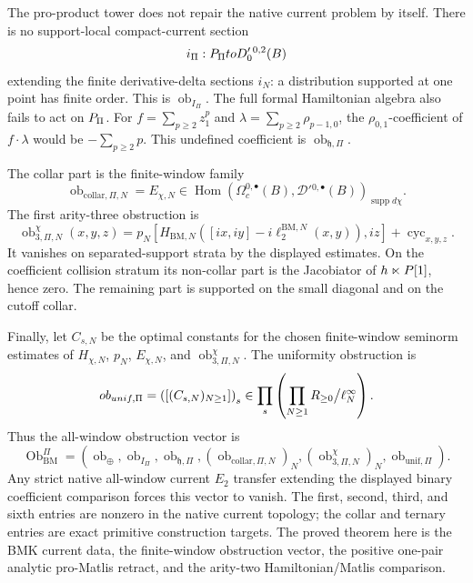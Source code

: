 \begin{thm}
  The pro-product tower does not repair the native current problem by
  itself.  There is no support-local compact-current section
  \[
    i_\Pi:P_{\Pi}toD'_0{}^{0,2}(B)
  \]
  extending the finite derivative-delta sections \(i_N\): a distribution
  supported at one point has finite order.  This is
  \(\operatorname{ob}_{I_\Pi}\).  The full formal Hamiltonian algebra also
  fails to act on \(P_{\Pi}\).  For
  \(f=\sum_{p\ge2}z_1^p\) and
  \(\lambda=\sum_{p\ge2}\rho_{p-1,0}\), the
  \(\rho_{0,1}\)-coefficient of \(f\cdot\lambda\) would be
  \(-\sum_{p\ge2}p\).  This undefined coefficient is
  \(\operatorname{ob}_{\mathfrak h,\Pi}\).

  The collar part is the finite-window family
  \[
    \operatorname{ob}_{\mathrm{collar},\Pi,N}
      =
      E_{\chi,N}
      \in
      \operatorname{Hom}\!
      \left(\Omega_c^{0,\bullet}(B),
      \mathcal D'{}^{0,\bullet}(B)\right)_{\operatorname{supp}d\chi}.
  \]
  The first arity-three obstruction is
  \[
    \operatorname{ob}^{\chi}_{3,\Pi,N}(x,y,z)
      =
      p_N[H_{\mathrm{BM},N}([ix,iy]-i\ell^{\mathrm{BM},N}_2(x,y)),iz]
      +\operatorname{cyc}_{x,y,z}.
  \]
  It vanishes on separated-support strata by the displayed estimates.
  On the coefficient collision stratum its non-collar part is the
  Jacobiator of \(h\ltimes P[1]\), hence zero.  The
  remaining part is supported on the small diagonal and on the cutoff
  collar.

  Finally, let \(C_{s,N}\) be the optimal constants for the chosen
  finite-window seminorm estimates of
  \(H_{\chi,N}\), \(p_N\), \(E_{\chi,N}\), and
  \(\operatorname{ob}^{\chi}_{3,\Pi,N}\).  The uniformity obstruction is
  \[
    ob_{unif,\Pi}
      =
      \left(\left[(C_{s,N})_{N\geq1}\right]\right)_s
      \in
      \prod_s
      \left(
        \prod_{N\geq1}R_{\geq0}\big/\ell^\infty_N
      \right).
  \]
  Thus the all-window obstruction vector is
  \[
    \operatorname{Ob}^{\Pi}_{\mathrm{BM}}
      =
      \left(
      \operatorname{ob}_{\oplus},
      \operatorname{ob}_{I_\Pi},
      \operatorname{ob}_{\mathfrak h,\Pi},
      (\operatorname{ob}_{\mathrm{collar},\Pi,N})_N,
      (\operatorname{ob}^{\chi}_{3,\Pi,N})_N,
      \operatorname{ob}_{\mathrm{unif},\Pi}
      \right).
  \]
  Any strict native all-window current \(E_2\) transfer extending the
  displayed binary coefficient comparison forces this vector to vanish.
  The first, second, third, and sixth entries are nonzero in the native
  current topology; the collar and ternary entries are exact primitive
  construction targets.  The proved theorem here is the BMK current data,
  the finite-window obstruction vector, the positive one-pair analytic
  pro-Matlis retract, and the arity-two Hamiltonian/Matlis comparison.


\end{thm}
